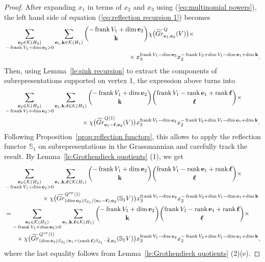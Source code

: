 \documentclass{amsart}
\numberwithin{equation}{section}
\theoremstyle{definition}
\def\SS{\mathbb{S}}
\def\bfe{\mathbf{e}}
\def\bfk{\mathbf{k}}
\def\bfl{{\ensuremath{\boldsymbol\ell}}}
\def\cK{\mathcal{K}}
\def\dim{\operatorname{dim}}
\def\frank{\operatorname{frank}}
\def\rank{\operatorname{rank}}
\newcommand{\rev}[1]{\overline{#1}}%
\renewcommand{\eqref}[1]{{\rm (\ref{#1})}}
\begin{document}
\begin{proof}
  After expanding $x_1$ in terms of $x_2$ and $x_3$ using \eqref{eq:multinomial powers}, the left hand side of equation \eqref{eq:reflection recursion 1} becomes
  \begin{align*}
    &\sum\limits_{\substack{\bfe_2\in\cK(H_2)\\-\frank V_1+\dim\bfe_2>0}}\sum\limits_{\bfe_1,\bfk\in\cK(H_1)}{-\frank V_1+\dim\bfe_2\choose\bfk}\chi\big(\widetilde{Gr}^Q_{\bfe_1,\bfe_2}(V)\big)\times\\
    &\hspace{2.65in}\times x_3^{\frank V_1-\dim\bfe_2}x_2^{-\frank V_2+\dim V_1-\dim\bfe_1+\dim\bfk}.
  \end{align*}
  Then, using Lemma~\ref{le:sink recursion} to extract the components of subrepresentations supported on vertex 1, the expression above turns into
  \begin{align*}
    &\sum\limits_{\substack{\bfe_2\in\cK(H_2)\\-\frank V_1+\dim\bfe_2>0}}\sum\limits_{\bfe_1,\bfk,\bfl\in\cK(H_1)}{-\frank V_1+\dim\bfe_2\choose\bfk}{\frank V_1-\rank\bfe_1+\rank\bfl\choose\bfl}\times\\
    &\hspace{1.65in}\times\chi\big(\widetilde{Gr}^{Q\langle 1\rangle}_{\bfe_1-\bfl,\bfe_2}(V)\big) x_3^{\frank V_1-\dim\bfe_2}x_2^{-\frank V_2+\dim V_1-\dim\bfe_1+\dim\bfk}.
  \end{align*}
  Following Proposition~\ref{prop:reflection functors}, this allows to apply the reflection functor $\SS_1$ on subrepresentations in the Grassmannian and carefully track the result.  By Lemma~\ref{le:Grothendieck quotients} (1), we get
  \begin{align*}
    &\sum\limits_{\substack{\bfe_2\in\cK(H_2)\\-\frank V_1+\dim\bfe_2>0}}\sum\limits_{\bfe_1,\bfk,\bfl\in\cK(H_1)}{-\frank V_1+\dim\bfe_2\choose\bfk}{\frank V_1-\rank\bfe_1+\rank\bfl\choose\bfl}\times\\
    &\hspace{0.8in}\times\chi\big(\widetilde{Gr}^{Q^{op}\langle 1\rangle}_{(\dim\bfe_2)\beta_{d_1}/(\bfe_1-\bfl),\bfe_2}(\SS_1 V)\big)x_3^{\frank V_1-\dim\bfe_2}x_2^{-\frank V_2+\dim V_1-\dim\bfe_1+\dim\bfk}\\
    &=\sum\limits_{\substack{\bfe_2\in\cK(H_2)\\-\frank V_1+\dim\bfe_2>0}}\sum\limits_{\bfe_1,\bfk,\bfl\in\cK(H_1)}{-\frank V_1+\dim\bfe_2\choose\bfk}{\frank V_1-\rank\bfe_1+\rank\bfl\choose\bfl}\times\\
    &\hspace{0.25in}\times\chi\big(\widetilde{Gr}^{Q^{op}\langle 1\rangle}_{(\dim\bfe_2)\beta_{d_1}/\bfe_1+(\rank\bfl)\beta_{d_1}-\rev{\bfl},\bfe_2}(\SS_1 V)\big)x_3^{\frank V_1-\dim\bfe_2}x_2^{-\frank V_2+\dim V_1-\dim\bfe_1+\dim\bfk},
  \end{align*}
  where the last equality follows from Lemma~\ref{le:Grothendieck quotients} (2)(e).


\end{proof}
\end{document}
